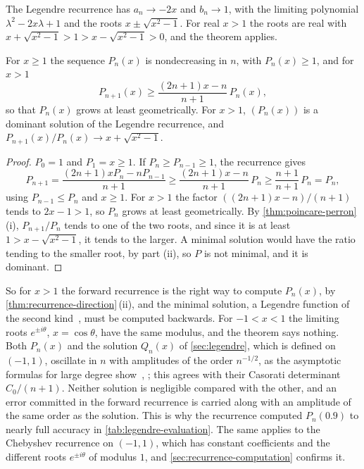 The Legendre recurrence has $a_n\to-2x$ and $b_n\to1$, with the limiting polynomial $\lambda^2-2x\lambda+1$ and the roots $x\pm\sqrt{x^2-1}$. For real $x>1$ the roots are real with $x+\sqrt{x^2-1}>1>x-\sqrt{x^2-1}>0$, and the theorem applies.

\begin{proposition}
\label{prop:legendre-outside}
For $x\ge1$ the sequence $P_n(x)$ is nondecreasing in $n$, with $P_n(x)\ge1$, and for $x>1$
\[
P_{n+1}(x)\ge\frac{(2n+1)x-n}{n+1}\,P_n(x),
\]
so that $P_n(x)$ grows at least geometrically. For $x>1$, $(P_n(x))$ is a dominant solution of the Legendre recurrence, and $P_{n+1}(x)/P_n(x)\to x+\sqrt{x^2-1}$.
\end{proposition}

\begin{proof}
$P_0=1$ and $P_1=x\ge1$. If $P_n\ge P_{n-1}\ge1$, the recurrence gives
\[
P_{n+1}=\frac{(2n+1)xP_n-nP_{n-1}}{n+1}\ge\frac{(2n+1)x-n}{n+1}\,P_n\ge\frac{n+1}{n+1}\,P_n=P_n ,
\]
using $P_{n-1}\le P_n$ and $x\ge1$. For $x>1$ the factor $((2n+1)x-n)/(n+1)$ tends to $2x-1>1$, so $P_n$ grows at least geometrically. By \cref{thm:poincare-perron}\,(i), $P_{n+1}/P_n$ tends to one of the two roots, and since it is at least $1>x-\sqrt{x^2-1}$, it tends to the larger. A minimal solution would have the ratio tending to the smaller root, by part (ii), so $P$ is not minimal, and it is dominant.
\end{proof}

So for $x>1$ the forward recurrence is the right way to compute $P_n(x)$, by \cref{thm:recurrence-direction}\,(ii), and the minimal solution, a Legendre function of the second kind~\cite[Chap.~XV]{whittaker1927}, must be computed backwards. For $-1<x<1$ the limiting roots $e^{\pm i\theta}$, $x=\cos\theta$, have the same modulus, and the theorem says nothing. Both $P_n(x)$ and the solution $Q_n(x)$ of \cref{sec:legendre}, which is defined on $(-1,1)$, oscillate in $n$ with amplitudes of the order $n^{-1/2}$, as the asymptotic formulas for large degree show~\cite[Chap.~VIII]{szego1975}, \cite[Sect.~14.15]{olver2010nist}; this agrees with their Casorati determinant $C_0/(n+1)$. Neither solution is negligible compared with the other, and an error committed in the forward recurrence is carried along with an amplitude of the same order as the solution. This is why the recurrence computed $P_n(0.9)$ to nearly full accuracy in \cref{tab:legendre-evaluation}. The same applies to the Chebyshev recurrence on $(-1,1)$, which has constant coefficients and the different roots $e^{\pm i\theta}$ of modulus $1$, and \cref{sec:recurrence-computation} confirms it.

